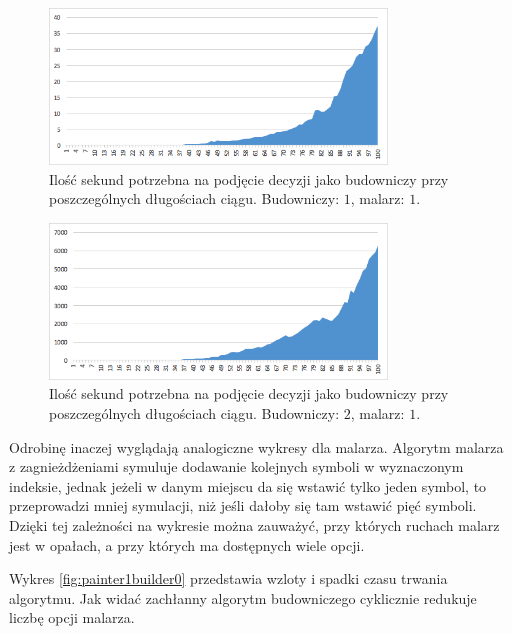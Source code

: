 \documentclass[document]{xmgr}
\begin{document}
\begin{figure}[tbh]
    \centering
    \includegraphics[width = 0.8\textwidth]{images/timeBuilder1Painter1}
    \caption{Ilość sekund potrzebna na podjęcie decyzji jako budowniczy przy poszczególnych długościach ciągu. Budowniczy: $1$, malarz: $1$.}
    \label{fig:builder1painter1}
\end{figure}

\begin{figure}[tbh]
    \centering
    \includegraphics[width = 0.8\textwidth]{images/timeBuilder2Painter1}
    \caption{Ilość sekund potrzebna na podjęcie decyzji jako budowniczy przy poszczególnych długościach ciągu. Budowniczy: $2$, malarz: $1$.}
    \label{fig:builder2painter1}
\end{figure}



Odrobinę inaczej wyglądają analogiczne wykresy dla malarza. Algorytm malarza z zagnieżdżeniami symuluje dodawanie kolejnych symboli w wyznaczonym indeksie, jednak jeżeli w danym miejscu da się wstawić tylko jeden symbol, to przeprowadzi mniej symulacji, niż jeśli dałoby się tam wstawić pięć symboli. Dzięki tej zależności na wykresie można zauważyć, przy których ruchach malarz jest w opałach, a przy których ma dostępnych wiele opcji.

Wykres \ref{fig:painter1builder0} przedstawia wzloty i spadki czasu trwania algorytmu. Jak widać zachłanny algorytm budowniczego cyklicznie redukuje liczbę opcji malarza.
\end{document}
